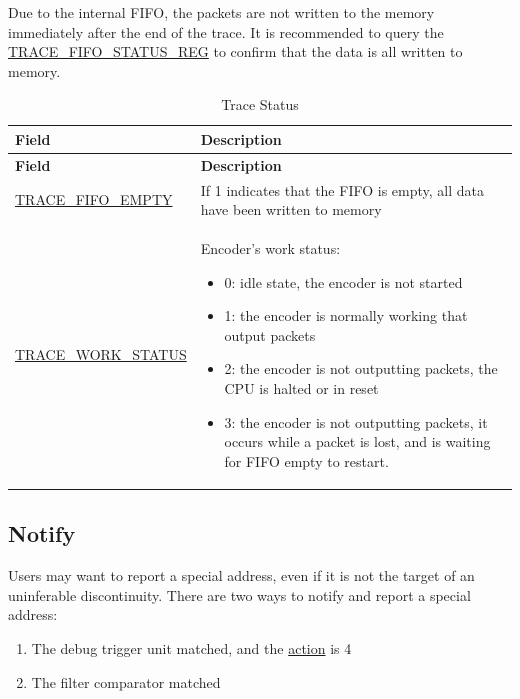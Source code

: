 \documentclass[main\_\_EN.tex]{subfiles}
\begin{document}
Due to the internal FIFO, the packets are not written to the memory immediately after the end of the trace. It is recommended to query the \hyperref[regdesc:TRACEFIFOSTATUSREG]{TRACE\_FIFO\_STATUS\_REG} to confirm that the data is all written to memory.

\begin{longtable}[c]{ |l|L{10cm}| }
    \caption{Trace Status}
    \label{riscvtracenc-trace-status}
    \\\hline{}
    \textbf{Field} & \textbf{Description} \\\hline
    \endfirsthead
    \textbf{Field} & \textbf{Description} \\\hline
    \endhead
    \endfoot
    \endlastfoot

    \hyperref[fielddesc:TRACEFIFOEMPTY]{TRACE\_FIFO\_EMPTY} & If 1 indicates that the FIFO is empty, all data have been written to memory \\\hline
    \hyperref[fielddesc:TRACEWORKSTATUS]{TRACE\_WORK\_STATUS} & Encoder's work status:
    \begin{itemize}
        \item 0: idle state, the encoder is not started
        \item 1: the encoder is normally working that output packets
        \item 2: the encoder is not outputting packets, the CPU is halted or in reset
        \item 3: the encoder is not outputting packets, it occurs while a packet is lost, and is waiting for FIFO empty to restart.
    \end{itemize}
    \\\hline

\end{longtable}

\subsection{Notify}\label{subsec:notify}

Users may want to report a special address, even if it is not the target of an uninferable discontinuity. There are two ways to notify and report a special address:

\begin{enumerate}
    \item The debug trigger unit matched, and the \hyperref[fielddesc:MCONTROLACTION]{action} is 4
    \item The filter comparator matched
\end{enumerate}
\end{document}
